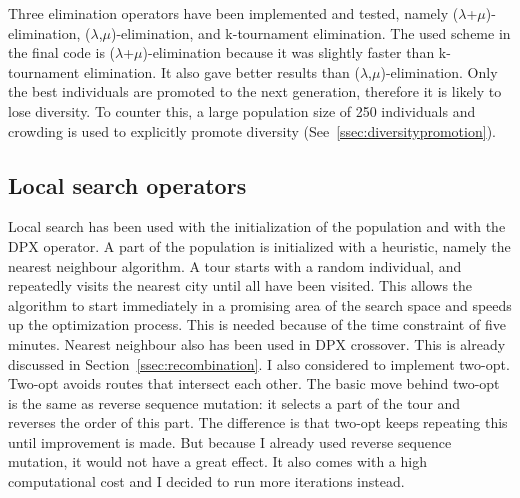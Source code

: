 \documentclass[a4paper,10pt]{article}
\newcommand{\ReplaceMe}[1]{{\color{blue}#1}}
\begin{document}

Three elimination operators have been implemented and tested, namely ($\lambda$+$\mu$)-elimination, ($\lambda$,$\mu$)-elimination, and k-tournament elimination. The used scheme in the final code is ($\lambda$+$\mu$)-elimination because it was slightly faster than k-tournament elimination. It also gave better results than ($\lambda$,$\mu$)-elimination. Only the best individuals are promoted to the next generation, therefore it is likely to lose diversity. To counter this, a large population size of 250 individuals and crowding is used to explicitly promote diversity (See~\ref{ssec:diversitypromotion}). 

\subsection{Local search operators}\label{ssec:localsearch}

Local search has been used with the initialization of the population and with the DPX operator. A part of the population is initialized with a heuristic, namely the nearest neighbour algorithm. A tour starts with a random individual, and repeatedly visits the nearest city until all have been visited. This allows the algorithm to start immediately in a promising area of the search space and speeds up the optimization process. This is needed because of the time constraint of five minutes. Nearest neighbour also has been used in DPX crossover. This is already discussed in Section~\ref{ssec:recombination}.
I also considered to implement two-opt. Two-opt avoids routes that intersect each other. The basic move behind two-opt is the same as reverse sequence mutation: it selects a part of the tour and reverses the order of this part. The difference is that two-opt keeps repeating this until improvement is made. But because I already used reverse sequence mutation, it would not have a great effect. It also comes with a high computational cost and I decided to run more iterations instead.  
\end{document}
